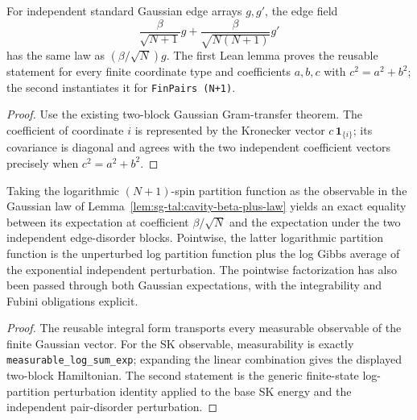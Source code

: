\begin{lemma}
\label{lem:sg-tal:cavity-beta-plus-law}
  \leanok
{}
For independent standard Gaussian edge arrays $g,g'$, the edge field
\[
  \frac\beta{\sqrt{N+1}}g+\frac\beta{\sqrt{N(N+1)}}g'
\]
has the same law as $(\beta/\sqrt N)g$.  The first Lean lemma proves the reusable statement
for every finite coordinate type and coefficients $a,b,c$ with $c^2=a^2+b^2$; the second
instantiates it for \texttt{FinPairs (N+1)}.
\end{lemma}
\begin{proof}
  \leanok
Use the existing two-block Gaussian Gram-transfer theorem.  The coefficient of coordinate $i$
is represented by the Kronecker vector $c\,\mathbf1_{\{i\}}$; its covariance is diagonal and
agrees with the two independent coefficient vectors precisely when $c^2=a^2+b^2$.
\end{proof}

\begin{lemma}
\label{lem:sg-tal:cavity-log-partition-law}
  \leanok
{}
Taking the logarithmic $(N+1)$-spin partition function as the observable in the Gaussian law of
Lemma~\ref{lem:sg-tal:cavity-beta-plus-law} yields an exact equality between its expectation at coefficient $\beta/\sqrt N$
and the expectation under the two independent edge-disorder blocks.  Pointwise, the latter
logarithmic partition function is the unperturbed log partition function plus the log Gibbs
average of the exponential independent perturbation.  The pointwise factorization has also been
passed through both Gaussian expectations, with the integrability and Fubini obligations explicit.
\end{lemma}
\begin{proof}
  \leanok
The reusable integral form transports every measurable observable of the finite Gaussian vector.
For the SK observable, measurability is exactly \texttt{measurable\_log\_sum\_exp}; expanding the
linear combination gives the displayed two-block Hamiltonian.  The second statement is the
generic finite-state log-partition perturbation identity applied to the base SK energy and the
independent pair-disorder perturbation.
\end{proof}

